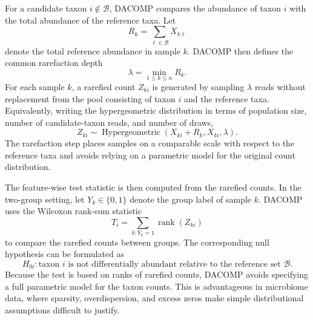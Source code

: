 \newpage
For a candidate taxon $i \notin \mathcal{B}$, DACOMP compares the abundance of taxon $i$ with the total abundance of the reference taxa. Let
\begin{equation}
	R_k = \sum_{\ell \in \mathcal{B}} X_{k\ell}
	\label{eq:4feature:dacomp_reference_abundance}
\end{equation}
denote the total reference abundance in sample $k$. DACOMP then defines the common rarefaction depth
\begin{equation}
	\lambda = \min_{1 \leq k \leq n} R_k.
	\label{eq:4feature:dacomp_rarefaction_depth}
\end{equation}
For each sample $k$, a rarefied count $Z_{ki}$ is generated by sampling $\lambda$ reads without replacement from the pool consisting of taxon $i$ and the reference taxa. Equivalently, writing the hypergeometric distribution in terms of population size, number of candidate-taxon reads, and number of draws,
\begin{equation}
	Z_{ki} \sim \operatorname{Hypergeometric}\!\left(X_{ki}+R_k, X_{ki}, \lambda\right).
	\label{eq:4feature:dacomp_rarefied_counts}
\end{equation}
The rarefaction step places samples on a comparable scale with respect to the reference taxa and avoids relying on a parametric model for the original count distribution.

The feature-wise test statistic is then computed from the rarefied counts. In the two-group setting, let $Y_k \in \{0,1\}$ denote the group label of sample $k$. DACOMP uses the Wilcoxon rank-sum statistic
\begin{equation}
	T_i = \sum_{k:Y_k = 1} \operatorname{rank}(Z_{ki})
	\label{eq:4feature:dacomp_test_statistic}
\end{equation}
to compare the rarefied counts between groups. The corresponding null hypothesis can be formulated as
\begin{equation}
	H_{0i}: \text{taxon } i \text{ is not differentially abundant relative to the reference set } \mathcal{B}.
	\label{eq:4feature:dacomp_null}
\end{equation}
Because the test is based on ranks of rarefied counts, DACOMP avoids specifying a full parametric model for the taxon counts. This is advantageous in microbiome data, where sparsity, overdispersion, and excess zeros make simple distributional assumptions difficult to justify.

